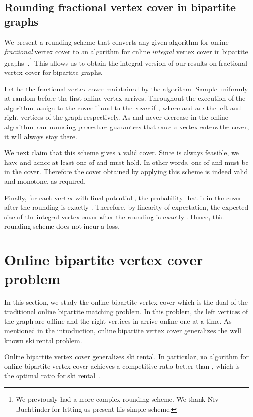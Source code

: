 \documentclass{article}
\begin{document}
\subsection{Rounding fractional vertex cover in bipartite graphs}
\label{sec:rounding}
We present a rounding scheme that converts any given algorithm for online {\em fractional} vertex cover to an algorithm for online {\em integral} vertex cover in bipartite graphs~\cite{NivPersonal}.\footnote{We previously had a more complex rounding scheme. We thank Niv Buchbinder for letting us present his simple scheme.} This allows us to obtain the integral version of our results on fractional vertex cover for bipartite graphs.

Let  be the fractional vertex cover maintained by the algorithm. Sample  uniformly at random before the first online vertex arrives. Throughout the execution of the algorithm, assign   to the cover if  and  to the cover if , where  and  are the left and right vertices of the graph  respectively.
As  and  never decrease in the online algorithm, our rounding procedure guarantees that once a vertex enters the cover, it will always stay there. 

We next claim that this scheme gives a valid cover. Since  is always feasible, we have  and hence at least one of  and  must hold. In other words, one of  and  must be in the cover.
Therefore the cover obtained by applying this scheme is indeed valid and monotone, as required.

Finally, for each vertex  with final potential , the probability that  is in the cover after the rounding is exactly . Therefore, by linearity of expectation, the expected size of the integral vertex cover after the rounding is exactly . Hence, this rounding scheme does not incur a loss.

\section{Online bipartite vertex cover problem}

In this section, we study the online bipartite vertex cover which is the dual of the traditional online bipartite matching problem. In this problem, the left vertices of the graph  are offline and the right vertices in  arrive online one at a time.
As mentioned in the introduction, online bipartite vertex cover generalizes the well known ski rental problem.
\begin{lemma}
Online bipartite vertex cover generalizes ski rental. In particular, no algorithm for online bipartite vertex cover achieves a competitive ratio better than , which is the optimal ratio for ski rental~\cite{Karlin1994}.
\end{lemma}
\end{document}
